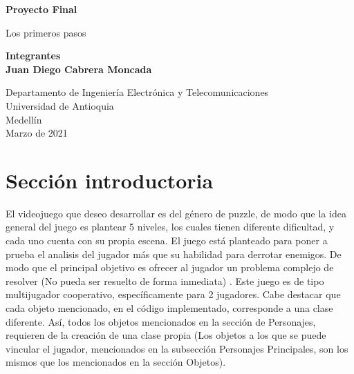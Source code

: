 \documentclass{article}
\begin{document}
\begin{titlepage}
    \begin{center}
        \vspace*{1cm}
            
        \Huge
        \textbf{Proyecto Final}
            
        \vspace{0.5cm}
        \LARGE
        Los primeros pasos
            
        \vspace{1.5cm}
            
        \textbf{Integrantes\\}
        \textbf{Juan Diego Cabrera Moncada}
            
        \vfill
            
        \vspace{0.8cm}
            
        \Large
        Departamento de Ingeniería Electrónica y Telecomunicaciones\\
        Universidad de Antioquia\\
        Medellín\\
        Marzo de 2021
            
    \end{center}
\end{titlepage}

\tableofcontents
\newpage
\section{Sección introductoria}\label{intro}
El videojuego que deseo desarrollar es del género de puzzle, de modo que la idea general del juego es plantear 5 niveles, los cuales tienen diferente dificultad, y cada uno cuenta con su propia escena. El juego está planteado para poner a prueba el analisis del jugador más que su habilidad para derrotar enemigos. De modo que el principal objetivo es ofrecer al jugador un problema complejo de resolver (No pueda ser resuelto de forma inmediata) \cite{Puzzle}. Este juego es de tipo multijugador cooperativo, específicamente para 2 jugadores. Cabe destacar que cada objeto mencionado, en el código implementado, corresponde a una clase diferente. Así, todos los objetos mencionados en la sección de Personajes, requieren de la creación de una clase propia (Los objetos a los que se puede vincular el jugador, mencionados en la subsección Personajes Principales, son los mismos que los mencionados en la sección Objetos).
\end{document}
